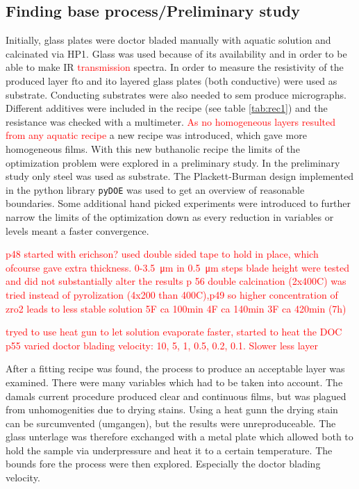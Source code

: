 \documentclass[a4paper]{article}
\newcommand{\td}[1]{\textcolor{red}{#1}}
\begin{document}
\subsection{Finding base process/Preliminary study}
Initially, glass plates were doctor bladed manually with aquatic solution and calcinated via HP1. 
Glass was used because of its availability and in order to be able to make IR \td{transmission} spectra.
In order to measure the resistivity of the produced layer \gls{fto} and \gls{ito} layered 
glass plates (both conductive) were used as substrate.
Conducting substrates were also needed to \gls{sem} produce micrographs. 
Different additives were included in the recipe (see table \ref{tab:rec1}) and the resistance was checked with a multimeter. 
\td{As no homogeneous layers resulted from any aquatic recipe} a new recipe was introduced, which gave more homogeneous films.
With this new buthanolic recipe the limits of the optimization problem were explored in a preliminary study.
In the preliminary study only steel was used as substrate.
The Plackett-Burman design implemented in the python library \texttt{pyDOE} was used to
get an overview of reasonable boundaries.
Some additional hand picked experiments were introduced to further narrow the limits of 
the optimization down as every reduction in variables or levels meant a faster convergence.

\td{p48 started with erichson? 
used double sided tape to hold in place, which ofcourse gave extra thickness.
0-\SI{3.5}{\micro\meter} in \SI{0.5}{\micro\meter} steps blade height were tested and did 
not substantially alter the results p 56
}
\td{
double calcination (2x400C) was tried instead of pyrolization (4x200 than 400C),p49
so higher concentration of zro2 leads to less stable solution
5F ca 100min
4F ca 140min
3F ca 420min (7h)
}

\td{tryed to use heat gun to let solution evaporate faster, started to heat the DOC p55}
\td{varied doctor blading velocity: 10, 5, 1, 0.5, 0.2, 0.1. Slower less layer}

After a fitting recipe was found, the process to produce an acceptable layer was examined. 
There were many variables which had to be taken into account. 
The damals current procedure produced clear and continuous films, but was plagued from 
unhomogenities due to drying stains. 
Using a heat gunn the drying stain can be surcumvented (umgangen), but the results were unreproduceable. 
The glass unterlage was therefore exchanged with a metal plate which allowed both to hold 
the sample via underpressure and heat it to a certain temperature.
The bounds fore the process were then explored. 
Especially the doctor blading velocity.
\end{document}
